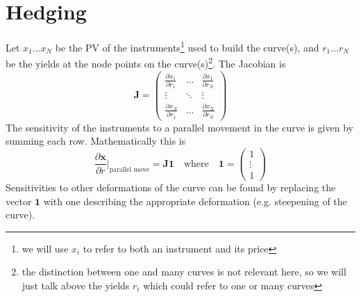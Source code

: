 \section{Hedging}
Let $x_1\ldots x_N$ be the PV of the instruments\footnote{we will use $x_i$ to refer to both an instrument and its price} used to build the curve(s), and  $r_1\ldots r_N$ be the yields at the node points on the curve(s)\footnote{the distinction between one and many curves is not relevant here, so we will just talk above the yields $r_i$ which could refer to one or many curves}. The Jacobian is
\begin{equation}
\mathbf{J} = \left(  
\begin{array}{ccc}
\frac{\partial x_{1}}{\partial r_1} & \ldots & \frac{\partial x_1}{\partial r_N}\\
\vdots&\ddots&\vdots\\
\frac{\partial x_N}{\partial r_1}&\ldots&\frac{\partial x_N}{\partial r_N}
\end{array}
\right)
\end{equation}
%
The sensitivity of the instruments to a parallel movement in the curve is given by summing each row. Mathematically this is 
\[
\frac{\partial \mathbf{x}}{\partial r}|_{\text{parallel move}} = \mathbf{J}\mathbf{1} \quad \text{where} \quad \mathbf{1} = \left(  
\begin{array}{c}
1\\
\vdots\\
1
\end{array}
\right)
\]
Sensitivities to other deformations of the curve can be found by replacing the vector $\mathbf{1}$ with one describing the appropriate deformation (e.g. steepening of the curve).
